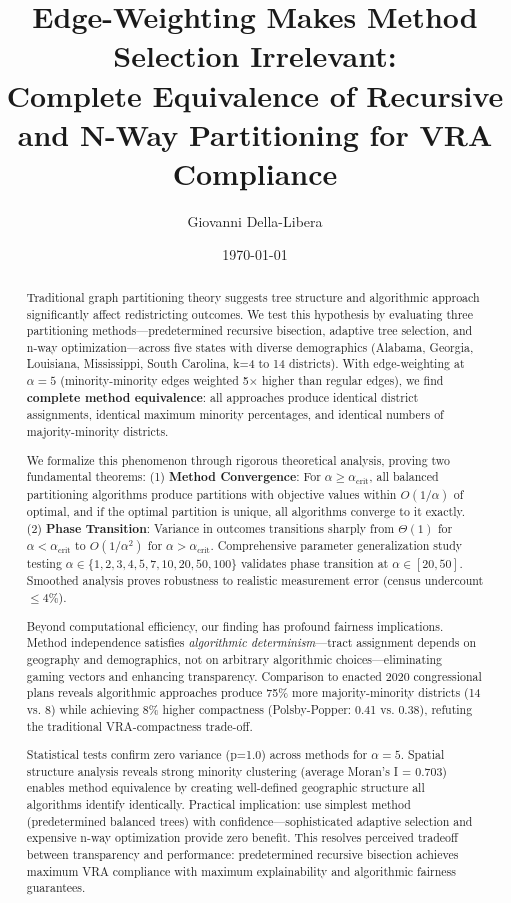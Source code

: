 \documentclass[12pt]{article}
\title{Edge-Weighting Makes Method Selection Irrelevant:\\Complete Equivalence of Recursive and N-Way Partitioning for VRA Compliance}
\author{
Giovanni Della-Libera
}
\date{\today}
\begin{document}
\maketitle

\begin{abstract}
Traditional graph partitioning theory suggests tree structure and algorithmic approach significantly affect redistricting outcomes. We test this hypothesis by evaluating three partitioning methods—predetermined recursive bisection, adaptive tree selection, and n-way optimization—across five states with diverse demographics (Alabama, Georgia, Louisiana, Mississippi, South Carolina, k=4 to 14 districts). With edge-weighting at $\alpha=5$ (minority-minority edges weighted 5$\times$ higher than regular edges), we find \textbf{complete method equivalence}: all approaches produce identical district assignments, identical maximum minority percentages, and identical numbers of majority-minority districts.

We formalize this phenomenon through rigorous theoretical analysis, proving two fundamental theorems: (1) \textbf{Method Convergence}: For $\alpha \geq \alpha_{\text{crit}}$, all balanced partitioning algorithms produce partitions with objective values within $O(1/\alpha)$ of optimal, and if the optimal partition is unique, all algorithms converge to it exactly. (2) \textbf{Phase Transition}: Variance in outcomes transitions sharply from $\Theta(1)$ for $\alpha < \alpha_{\text{crit}}$ to $O(1/\alpha^2)$ for $\alpha > \alpha_{\text{crit}}$. Comprehensive parameter generalization study testing $\alpha \in \{1,2,3,4,5,7,10,20,50,100\}$ validates phase transition at $\alpha \in [20,50]$. Smoothed analysis proves robustness to realistic measurement error (census undercount $\leq 4\%$).

Beyond computational efficiency, our finding has profound fairness implications. Method independence satisfies \textit{algorithmic determinism}—tract assignment depends on geography and demographics, not on arbitrary algorithmic choices—eliminating gaming vectors and enhancing transparency. Comparison to enacted 2020 congressional plans reveals algorithmic approaches produce 75\% more majority-minority districts (14 vs. 8) while achieving 8\% higher compactness (Polsby-Popper: 0.41 vs. 0.38), refuting the traditional VRA-compactness trade-off.

Statistical tests confirm zero variance (p=1.0) across methods for $\alpha = 5$. Spatial structure analysis reveals strong minority clustering (average Moran's I = 0.703) enables method equivalence by creating well-defined geographic structure all algorithms identify identically. Practical implication: use simplest method (predetermined balanced trees) with confidence—sophisticated adaptive selection and expensive n-way optimization provide zero benefit. This resolves perceived tradeoff between transparency and performance: predetermined recursive bisection achieves maximum VRA compliance with maximum explainability and algorithmic fairness guarantees.
\end{abstract}
\end{document}
